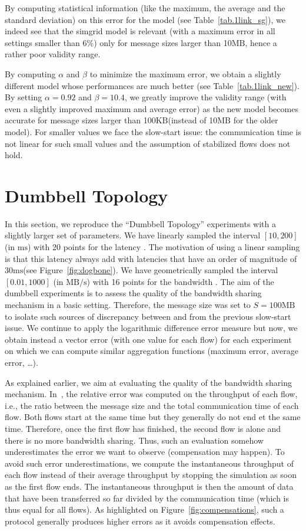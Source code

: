 \documentclass{sig-alternate}
\def\ie{i.e.,\xspace}
\def\ms{\ensuremath{\text{ms}}\xspace}%
\def\MBps{\ensuremath{\text{MB}/\text{s}}\xspace}%
\def\MB{\ensuremath{\text{MB}}\xspace}%
\def\KB{\ensuremath{\text{KB}}\xspace}%
\begin{document}
By computing statistical information (like the maximum, the average
and the standard deviation) on this error for the \simgrid model (see
Table~\ref{tab.1link_sg}), we indeed see that the simgrid model is
relevant (with a maximum error in all settings smaller than 6\%) only
for message sizes larger than 10\MB, hence a rather poor validity range.

By computing $\alpha$ and $\beta$ to minimize the maximum error,
we obtain a slightly different model whose performances are much
better (see Table~\ref{tab.1link_new}). By setting $\alpha=0.92$ and
$\beta=10.4$, we greatly improve the validity range (with even
a slightly improved maximum and average error) as the new model
becomes accurate for message sizes larger than 100\KB (instead of
10\MB for the older model). For smaller
values we face the slow-start issue: the communication time is
not linear for such small values and the assumption of
stabilized flows does not hold.


\section{Dumbbell Topology}
\label{sec.dogbone}

In this section, we reproduce the ``Dumbbell Topology'' experiments with a
slightly larger set of parameters. We have linearly sampled the
interval $[10,200]$ (in \ms) with 20 points for the latency
\LDogbone. The motivation of using a linear sampling is that this
latency always add with latencies that have an order of magnitude of
30\ms (see Figure~\ref{fig:dogbone}). We have geometrically sampled
the interval $[0.01,1000]$ (in \MBps) with 16 points for the bandwidth
\BDogbone. The aim of the dumbbell experiments is to assess
the quality of the bandwidth sharing mechanism in a basic
setting. Therefore, the message size was set to $S=100\MB$ to isolate
such sources of discrepancy between \simgrid and \gtnets from the
previous slow-start issue. We continue to apply the logarithmic
difference error measure but now, we obtain instead a vector error
(with one value for each flow) for each experiment on which we can
compute similar aggregation functions (maximum error, average error,
\dots).

As explained earlier, we aim at evaluating the quality of the
bandwidth sharing mechanism. In~\cite{nstools07}, the relative error
was computed on the throughput of each flow, \ie the ratio between the
message size and the total communication time of each flow. Both flows
start at the same time but they generally do not end et the same
time. Therefore, once the first flow has finished, the second flow is
alone and there is no more bandwidth sharing. Thus, such an evaluation
somehow underestimates the error we want to observe (compensation may
happen). To avoid such error underestimations, we compute the
instantaneous throughput of each flow instead of their average
throughput by stopping the simulation as soon as the first flow
ends. The instantaneous throughput is then the amount of data that
have been transferred so far divided by the communication time (which
is thus equal for all flows). As highlighted on
Figure~\ref{fig:compensations}, such a protocol generally produces
higher errors as it avoids compensation effects.
\end{document}
